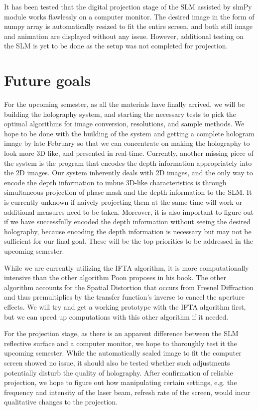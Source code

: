 \documentclass[12pt]{article}
\begin{document}
It has been tested that the digital projection stage of the SLM assisted by slmPy module works flawlessly on a computer monitor. The desired image in the form of numpy array is automatically resized to fit the entire screen, and both still image and animation are displayed without any issue. However, additional testing on the SLM is yet to be done as the setup was not completed for projection.

\section{Future goals}
For the upcoming semester, as all the materials have finally arrived, we will be building the holography system, and starting the necessary tests to pick the optimal algorithms for image conversion, resolutions, and sample methods. We hope to be done with the building of the system and getting a complete hologram image by late February so that we can concentrate on making the holography to look more 3D like, and presented in real-time. Currently, another missing piece of the system is the program that encodes the depth information appropriately into the 2D images. Our system inherently deals with 2D images, and the only way to encode the depth information to imbue 3D-like characteristics is through simultaneous projection of phase mask and the depth information to the SLM. It is currently unknown if naively projecting them at the same time will work or additional measures need to be taken. Moreover, it is also important to figure out if we have successfully encoded the depth information without seeing the desired holography, because encoding the depth information is necessary but may not be sufficient for our final goal. These will be the top priorities to be addressed in the upcoming semester.

While we are currently utilizing the IFTA algorithm, it is more computationally intensive than the other algorithm Poon proposes in his book. The other algorithm accounts for the Spatial Distortion that occurs from Fresnel Diffraction and thus premultiplies by the transfer function's inverse to cancel the aperture effects. We will try and get a working prototype with the IFTA algorithm first, but we can speed up computations with this other algorithm if it needed.

For the projection stage, as there is an apparent difference between the SLM reflective surface and a computer monitor, we hope to thoroughly test it the upcoming semester. While the automatically scaled image to fit the computer screen showed no issue, it should also be tested whether such adjustments potentially disturb the quality of holography. After confirmation of reliable projection, we hope to figure out how manipulating certain settings, e.g. the frequency and intensity of the laser beam, refresh rate of the screen, would incur qualitative changes to the projection.



\end{document}
